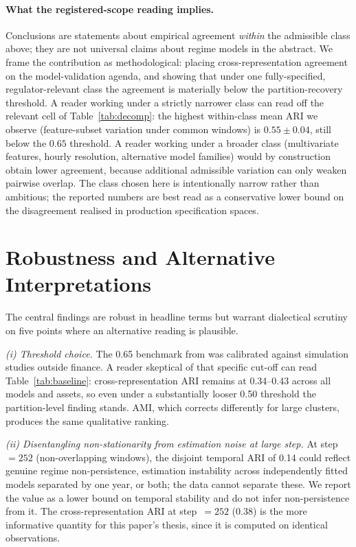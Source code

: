 \documentclass[preprint,12pt,authoryear]{elsarticle}
\begin{document}
\paragraph{What the registered-scope reading implies.}
Conclusions are statements about empirical agreement \emph{within} the admissible class above; they are not universal claims about regime models in the abstract. We frame the contribution as methodological: placing cross-representation agreement on the model-validation agenda, and showing that under one fully-specified, regulator-relevant class the agreement is materially below the partition-recovery threshold. A reader working under a strictly narrower class can read off the relevant cell of Table~\ref{tab:decomp}: the highest within-class mean ARI we observe (feature-subset variation under common windows) is $0.55\pm 0.04$, still below the $0.65$ threshold. A reader working under a broader class (multivariate features, hourly resolution, alternative model families) would by construction obtain lower agreement, because additional admissible variation can only weaken pairwise overlap. The class chosen here is intentionally narrow rather than ambitious; the reported numbers are best read as a conservative lower bound on the disagreement realised in production specification spaces.

\section{Robustness and Alternative Interpretations}
\label{app:dialectical}

The central findings are robust in headline terms but warrant dialectical scrutiny on five points where an alternative reading is plausible.

\emph{(i) Threshold choice.} The 0.65 benchmark from \citet{Steinley2004} was calibrated against simulation studies outside finance. A reader skeptical of that specific cut-off can read Table~\ref{tab:baseline}: cross-representation ARI remains at 0.34--0.43 across all models and assets, so even under a substantially looser 0.50 threshold the partition-level finding stands. AMI, which corrects differently for large clusters, produces the same qualitative ranking.

\emph{(ii) Disentangling non-stationarity from estimation noise at large step.} At step~$=252$ (non-overlapping windows), the disjoint temporal ARI of 0.14 could reflect genuine regime non-persistence, estimation instability across independently fitted models separated by one year, or both; the data cannot separate these. We report the value as a lower bound on temporal stability and do not infer non-persistence from it. The cross-representation ARI at step~$=252$ (0.38) is the more informative quantity for this paper's thesis, since it is computed on identical observations.
\end{document}
